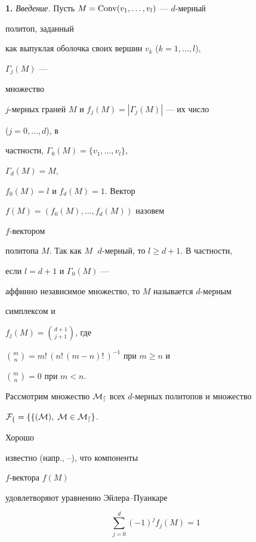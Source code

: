 




\maketitle





{\bf 1.} {\it Введение.} Пусть $M=\operatorname{Conv}(v_1,\dotsc,v_l)$ --- $d$-мерный


политоп, заданный


как выпуклая оболочка своих вершин $v_k$ ($k=1,\dotsc,l$),


$\Gamma_j(M)$ ---


множество


$j$-мерных граней $M$ и $f_j(M)=|\Gamma_j(M)|$ --- их число


($j=0,\dotsc,d$), в


частности, $\Gamma_0(M)=\{v_1,\dotsc,v_l\}$,


$\Gamma_d(M)=M$,


$f_0(M)=l$ и $f_d(M)=1$. Вектор


$f(M)=(f_0(M),\dotsc,f_d(M))$ назовем


$f$-вектором


политопа $M$. Так как $M$ $\;d$-мерный, то $l\ge d+1$. В частности,


если $l=d+1$ и $\Gamma_0(M)$ ---


аффинно независимое множество, то $M$ называется $d$-мерным


симплексом и


$f_j(M)=\binom{d+1}{j+1}$, где


$\binom{m}{n}=m!\,(n!\,(m-n)!\,)^{-1}$ при $m\ge n$ и


$\binom{m}{n}=0$ при $m<n$.





Рассмотрим множество $\cal M_d$ всех $d$-мерных политопов и множество


$\cal F_f=\{f(M),\;M\in\cal M_d\}$.


Хорошо


известно (напр., \cite{Bre}--\cite{Gru}), что компоненты


$f$-вектора $f(M)$


удовлетворяют уравнению Эйлера--Пуанкаре


\begin{equation}


\sum^d_{j=0}(-1)^j f_j(M)=1


\end{equation}


